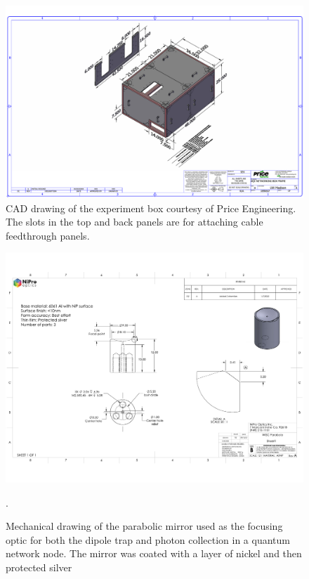 \begin{figure}
    \centering
    \includegraphics[width=1\textwidth]{Images/AQX Networking Box Frame LAYOUT.pdf}
    \caption{CAD drawing of the experiment box courtesy of Price Engineering. The slots in the top and back panels are for attaching cable feedthrough panels.}
    \label{fig:experiment_box_frame}
\end{figure}


\newpage

\begin{figure}
    \centering
    \includegraphics[width=1\textwidth]{Images/nipro_parabolic_mirror_drawing.pdf}
    \caption{Mechanical drawing of the parabolic mirror used as the focusing optic for both the dipole trap and photon collection in a quantum network node. The mirror was coated with a layer of nickel and then protected silver}.
    \label{fig:mirror}
\end{figure}

